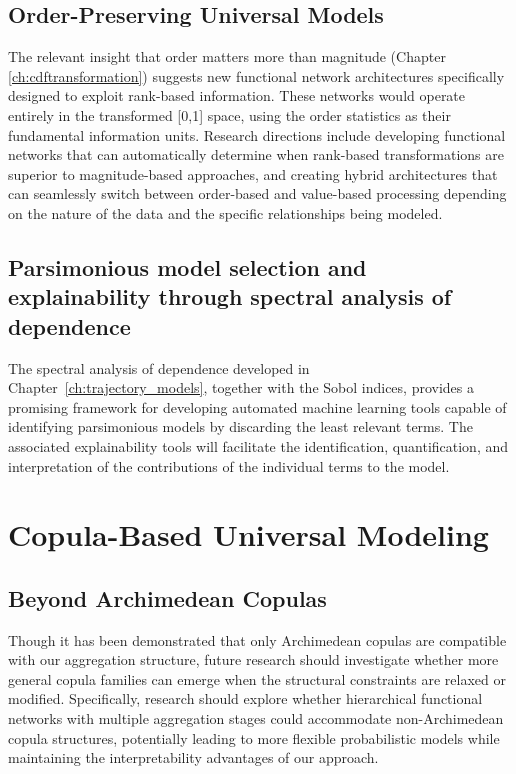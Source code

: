\subsection{Order-Preserving Universal Models}
The relevant insight that order matters more than magnitude (Chapter \ref{ch:cdftransformation}) suggests new functional network architectures specifically designed to exploit rank-based information. These networks would operate entirely in the transformed [0,1] space, using the order statistics as their fundamental information units.
Research directions include developing functional networks that can automatically determine when rank-based transformations are superior to magnitude-based approaches, and creating hybrid architectures that can seamlessly switch between order-based and value-based processing depending on the nature of the data and the specific relationships being modeled.

\subsection{Parsimonious model selection and explainability through spectral analysis of dependence}

The spectral analysis of dependence developed in Chapter~\ref{ch:trajectory_models}, together with the Sobol indices, provides a promising framework for developing automated machine learning tools capable of identifying parsimonious models by discarding the least relevant terms. The associated explainability tools will facilitate the identification, quantification, and interpretation of the contributions of the individual terms to the model.
\section{Copula-Based Universal Modeling}
\subsection{Beyond Archimedean Copulas}
Though it has been demonstrated that only Archimedean copulas are compatible with our aggregation structure, future research should investigate whether more general copula families can emerge when the structural constraints are relaxed or modified.
Specifically, research should explore whether hierarchical functional networks with multiple aggregation stages could accommodate non-Archimedean copula structures, potentially leading to more flexible probabilistic models while maintaining the interpretability advantages of our approach.

